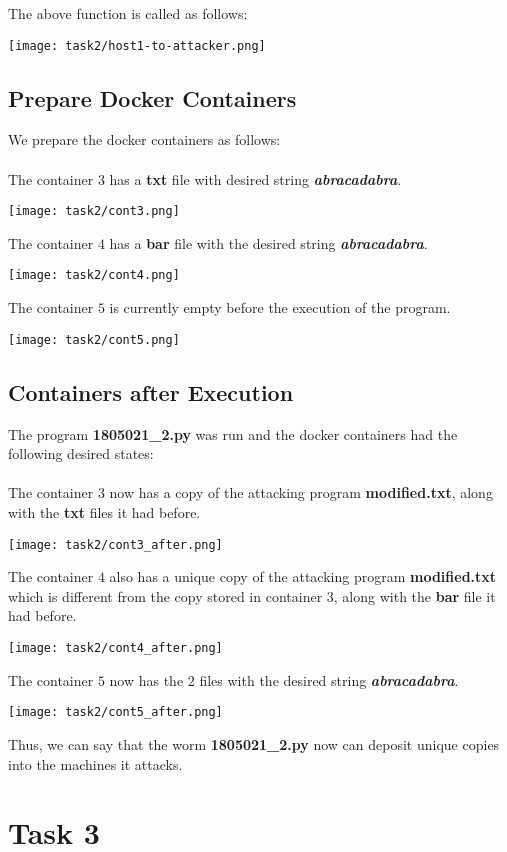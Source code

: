\documentclass{article}
\begin{document}
The above function is called as follows:
\begin{center}
    \texttt{[image: task2/host1-to-attacker.png]}
\end{center}

\subsection{Prepare Docker Containers}
We prepare the docker containers as follows:\\\\
The container $3$ has a \textbf{txt} file with desired string \textbf{\textit{abracadabra}}.
\begin{center}
    \texttt{[image: task2/cont3.png]}
\end{center}
The container $4$ has a \textbf{bar} file with the desired string \textbf{\textit{abracadabra}}.
\begin{center}
    \texttt{[image: task2/cont4.png]}
\end{center}
The container $5$ is currently empty before the execution of the program.
\begin{center}
    \texttt{[image: task2/cont5.png]}
\end{center}


\subsection{Containers after Execution}
The program \textbf{1805021\_2.py} was run and the docker containers had the following desired states:\\\\

The container $3$ now has a copy of the attacking program \textbf{modified.txt}, along with the \textbf{txt} files it had before. 
\begin{center}
    \texttt{[image: task2/cont3\_after.png]}
\end{center}

The container $4$ also has a unique copy of the attacking program \textbf{modified.txt} which is different from the copy stored in container $3$, along with the \textbf{bar} file it had before. 
\begin{center}
    \texttt{[image: task2/cont4\_after.png]}
\end{center}

The container $5$ now has the $2$ files with the desired string \textbf{\textit{abracadabra}}.
\begin{center}
    \texttt{[image: task2/cont5\_after.png]}
\end{center}

Thus, we can say that the worm \textbf{1805021\_2.py} now can deposit unique copies into the machines it attacks.


\section{Task 3}
\end{document}
